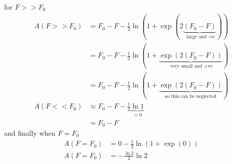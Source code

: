 for $F>>F_0$
\begin{align}
  A(F>>F_0) &= F_0 - F  -\frac{1}{2} \ln\left(1+\exp(2\underbrace{(F_0 - F)}_{\text{ large and -ve}})\right) \nonumber \\
  &= F_0 - F  -\frac{1}{2} \ln\left(1+\underbrace{\exp(2(F_0 - F))}_{\text{ very small and +ve}}\right) \nonumber \\
  &= F_0 - F  -\frac{1}{2} \ln\left(1+\underbrace{\exp(2(F_0 - F))}_{\text{so this can be neglected}}\right) \nonumber \\
  A(F<<F_0) &\approx F_0 - F  -\frac{1}{2} \underbrace{\ln 1}_{=0} \nonumber \\
  &= F_0 - F \label{eq:RC_log_log_large_F}
\end{align}
and finally when $F=F_0$
\begin{align}
  A(F=F_0) &=  0 -\frac{1}{2} \ln\left(1+\exp(0)\right) \nonumber \\
  A(F=F_0) &= -\frac{\ln 2}{2} \ln 2 \label{eq:RC_log_log_equal}
\end{align}
